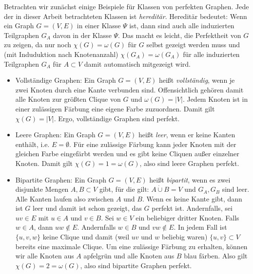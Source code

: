 \documentclass[../main.tex]{subfiles}
\begin{document}

Betrachten wir zunächst einige Beispiele für Klassen von perfekten Graphen. Jede der in dieser Arbeit betrachteten Klassen ist \emph{hereditär}. Hereditär bedeutet: Wenn ein Graph $G  = (V, E)$ in einer Klasse $\Psi$ ist, dann sind auch alle induzierten Teilgraphen $G_A$ davon in der Klasse $\Psi$. Das macht es leicht, die Perfektheit von $G$ zu zeigen, da nur noch $\chi(G) =  \omega(G)$ für $G$ selbst gezeigt werden muss und (mit Induduktion nach Knotenanzahl) $\chi(G_A) = \omega(G_A)$ für alle induzierten Teilgraphen $G_A$ für $A \subset V$ damit automatisch mitgezeigt wird.

\begin{itemize}
    \item Vollständige Graphen: Ein Graph $G = (V, E)$ heißt \emph{vollständig}, wenn je zwei Knoten durch eine Kante verbunden sind. Offensichtlich gehören damit alle Knoten zur größten Clique von $G$ und $\omega(G) = |V|$. Jedem Knoten ist in einer zulässigen Färbung eine eigene Farbe zuzuordnen. Damit gilt $\chi(G) = |V|$. Ergo, vollständige Graphen sind perfekt.
    \item Leere Graphen: Ein Graph $G = (V, E)$ heißt \emph{leer}, wenn er keine Kanten enthält, i.e. $E = \emptyset$. Für eine zulässige Färbung kann jeder Knoten mit der gleichen Farbe eingefärbt werden und es gibt keine Cliquen außer einzelner Knoten. Damit gilt $\chi(G) = 1 = \omega(G)$, also sind leere Graphen perfekt.
    \item Bipartite Graphen: Ein Graph $G = (V, E)$ heißt \emph{bipartit}, wenn es zwei disjunkte Mengen $A, B \subset V$ gibt, für die gilt: $A \dot\cup B = V$ und $G_A, G_B$ sind leer. Alle Kanten laufen also zwischen $A$ und $B$. Wenn es keine Kante gibt, dann ist $G$ leer und damit ist schon gezeigt, das $G$ perfekt ist. Andernfalls, sei $uv \in E$ mit $u \in A$ und $v \in B$. Sei $w \in V$ ein beliebiger dritter Knoten. Falls $w \in A$, dann $uw \notin E$. Andernfalls $w \in B$ und $vw \notin E$. In jedem Fall ist $\{u, v, w\}$ keine Clique und damit (weil $uv$ und $w$ beliebig waren) $\{u, v\} \subset V$ bereits eine maximale Clique. Um eine zulässige Färbung zu erhalten, können wir alle Knoten aus $A$ apfelgrün und alle Knoten aus $B$ blau färben. Also gilt $\chi(G) = 2 = \omega(G)$, also sind bipartite Graphen perfekt.
\end{itemize}
\end{document}
